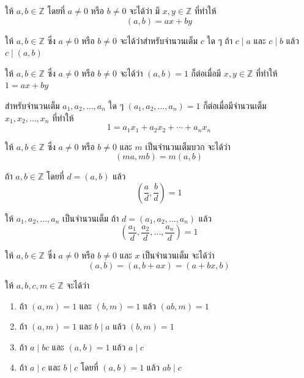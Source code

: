 \begin{theorembox}
	ให้ $a, b \in \mathbb{Z}$ โดยที่ $a \neq 0$ หรือ $b \neq 0$ จะได้ว่า มี $x, y \in \mathbb{Z}$ ที่ทำให้ 
	\[ (a, b) = ax + by \]
\end{theorembox}

\begin{corollarybox}
	ให้ $a, b \in \mathbb{Z}$ ซึ่ง $a \neq 0$ หรือ $b \neq 0$ จะได้ว่าสำหรับจำนวนเต็ม $c$ ใด ๆ ถ้า $c \mid a$ และ $c \mid b$ แล้ว $c \mid (a, b)$
\end{corollarybox}

\begin{theorembox}
	ให้ $a, b \in \mathbb{Z}$ ซึ่ง $a \neq 0$ หรือ $b \neq 0$ จะได้ว่า $(a, b) = 1$ ก็ต่อเมื่อมี $x, y \in \mathbb{Z}$ ที่ทำให้ $1 = ax + by$
\end{theorembox}

\begin{theorembox}
	สำหรับจำนวนเต็ม $a_1, a_2, \ldots, a_n$ ใด ๆ $\left(a_1, a_2, \ldots, a_n\right) = 1$ ก็ต่อเมื่อมีจำนวนเต็ม $x_1, x_2, \ldots, x_n$ ที่ทำให้ 
	\[ 1 = a_1 x_1 + a_2 x_2 + \cdots + a_n x_n \]
\end{theorembox}

\begin{theorembox}
	ให้ $a, b \in \mathbb{Z}$ ซึ่ง $a \neq 0$ หรือ $b \neq 0$ และ $m$ เป็นจำนวนเต็มบวก จะได้ว่า
	\[(ma, mb) = m(a, b)\]
\end{theorembox}

\begin{theorembox}
	ถ้า $a, b \in \mathbb{Z}$ โดยที่ $d = (a, b)$ แล้ว
	\[\left(\frac{a}{d}, \frac{b}{d}\right) = 1\]
\end{theorembox}

\begin{theorembox}
	ให้ $a_1, a_2, \ldots, a_n$ เป็นจำนวนเต็ม ถ้า $d = \left(a_1, a_2, \ldots, a_n\right)$ แล้ว
	\[\left(\frac{a_1}{d}, \frac{a_2}{d}, \ldots, \frac{a_n}{d}\right) = 1\] 
\end{theorembox}

\begin{theorembox}
	ให้ $a, b \in \mathbb{Z}$ ซึ่ง $a \neq 0$ หรือ $b \neq 0$ และ $x$ เป็นจำนวนเต็ม จะได้ว่า
	\[ (a, b) = (a, b + ax) = (a + bx, b) \]
\end{theorembox}

\newpage
\begin{theorembox}
	ให้ $a, b, c, m \in \mathbb{Z}$ จะได้ว่า
	\begin{enumerate}
		\item ถ้า $(a, m) = 1$ และ $(b, m) = 1$ แล้ว $(ab, m) = 1$
		\item ถ้า $(a, m) = 1$ และ $b \mid a$ แล้ว $(b, m) = 1$
		\item ถ้า $a \mid bc$ และ $(a, b) = 1$ แล้ว $a \mid c$
		\item ถ้า $a \mid c$ และ $b \mid c$ โดยที่ $(a, b) = 1$ แล้ว $ab \mid c$
	\end{enumerate}
\end{theorembox}

